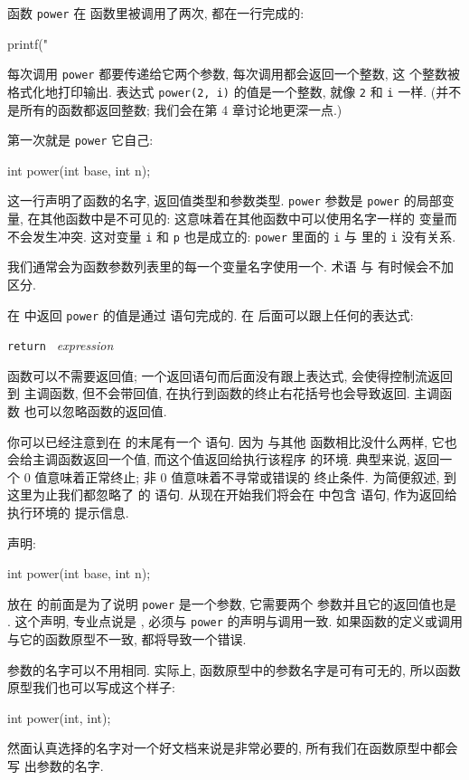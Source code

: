 函数 \texttt{power} 在 \cmain 函数里被调用了两次, 都在一行完成的:
\begin{myverbatim}
    printf("%
\end{myverbatim}
每次调用 \texttt{power} 都要传递给它两个参数, 每次调用都会返回一个整数, 这
个整数被格式化地打印输出. 表达式 \texttt{power(2, i)} 的值是一个整数, 就像 
\texttt{2} 和 \texttt{i} 一样. (并不是所有的函数都返回整数; 我们会在第 4 
章讨论地更深一点.)

第一次就是 \texttt{power} 它自己:
\begin{myverbatim}
    int power(int base, int n);
\end{myverbatim}
这一行声明了函数的名字, 返回值类型和参数类型. \texttt{power} 参数是 \texttt{power}
的局部变量, 在其他函数中是不可见的: 这意味着在其他函数中可以使用名字一样的
变量而不会发生冲突. 这对变量 \texttt{i} 和 \texttt{p} 也是成立的:
\texttt{power} 里面的 \texttt{i} 与 \cmain 里的 \texttt{i} 没有关系.

我们通常会为函数参数列表里的每一个变量名字使用一个. 术语
 与  有时候会不加区分.

在 \cmain 中返回 \texttt{power} 的值是通过 \creturn 语句完成的. 在 \creturn
后面可以跟上任何的表达式:
\begin{mypsudo} \texttt{return } \textit{expression} \end{mypsudo}

函数可以不需要返回值; 一个返回语句而后面没有跟上表达式, 会使得控制流返回到
主调函数, 但不会带回值, 在执行到函数的终止右花括号也会导致返回. 主调函数 
也可以忽略函数的返回值.

你可以已经注意到在 \cmain 的末尾有一个 \creturn 语句. 因为 \cmain 与其他
函数相比没什么两样, 它也会给主调函数返回一个值, 而这个值返回给执行该程序
的环境. 典型来说, 返回一个 0 值意味着正常终止; 非 0 值意味着不寻常或错误的
终止条件. 为简便叙述, 到这里为止我们都忽略了 \cmain 的 \creturn 语句.
从现在开始我们将会在 \cmain 中包含 \creturn 语句, 作为返回给执行环境的 
提示信息. 

声明:
\begin{myverbatim} 
    int power(int base, int n);
\end{myverbatim}
放在 \cmain 的前面是为了说明 \texttt{power} 是一个参数, 它需要两个 \cint
参数并且它的返回值也是 \cint. 这个声明, 专业点说是 , 必须与
\texttt{power} 的声明与调用一致. 如果函数的定义或调用与它的函数原型不一致,
都将导致一个错误.

参数的名字可以不用相同. 实际上, 函数原型中的参数名字是可有可无的,
所以函数原型我们也可以写成这个样子:
\begin{myverbatim}
    int power(int, int);
\end{myverbatim}
然面认真选择的名字对一个好文档来说是非常必要的, 所有我们在函数原型中都会写
出参数的名字.

